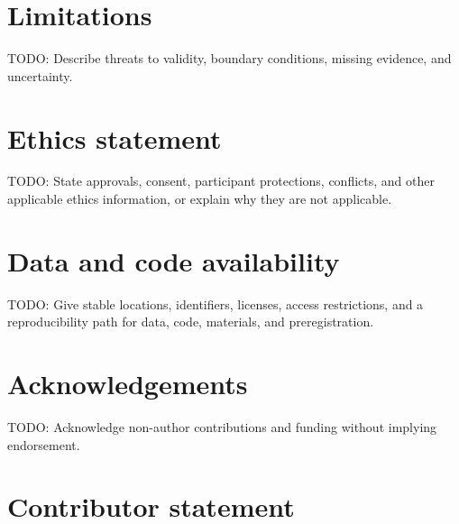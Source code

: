 \section{Limitations}

TODO: Describe threats to validity, boundary conditions, missing evidence, and
uncertainty.

\section{Ethics statement}

TODO: State approvals, consent, participant protections, conflicts, and other
applicable ethics information, or explain why they are not applicable.

\section{Data and code availability}

TODO: Give stable locations, identifiers, licenses, access restrictions, and a
reproducibility path for data, code, materials, and preregistration.

\section{Acknowledgements}

TODO: Acknowledge non-author contributions and funding without implying
endorsement.

\section{Contributor statement}

\BeaconContributorStatement
